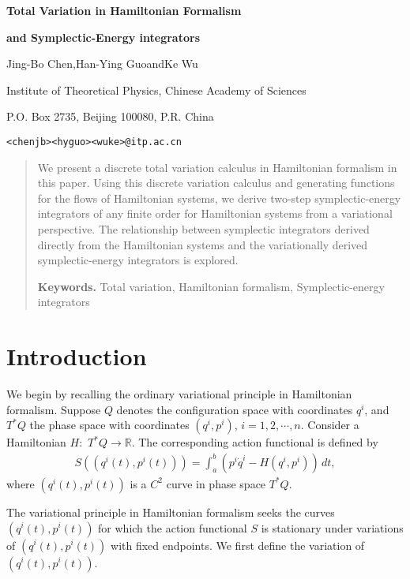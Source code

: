\documentclass[a4paper,a4paper]{article}
\def\sect#1{\section{#1}\setcounter{equation}{0}}
\begin{document}

\centerline{} \vskip0.5cm \centerline{\LARGE \bf Total Variation
in Hamiltonian Formalism} \vskip3pt \centerline{\LARGE \bf and
Symplectic-Energy integrators } \vskip0.7cm \centerline{\large
Jing-Bo Chen,\quad Han-Ying Guo\quad and\quad Ke Wu} \vskip3pt
\centerline{\small Institute of Theoretical Physics, Chinese
Academy of Sciences} \vskip3pt \centerline{\small P.O. Box  2735,
Beijing 100080, P.R. China} \vskip3pt \centerline{\small
\texttt{<chenjb><hyguo><wuke>@itp.ac.cn}} \vskip1cm


\begin{abstract}
We present a discrete total variation calculus in Hamiltonian
formalism in this paper. Using this discrete variation calculus
and generating functions for the flows of Hamiltonian systems, we
derive two-step symplectic-energy integrators of any finite order
for Hamiltonian systems from a variational perspective. The
relationship between symplectic integrators derived directly from
the Hamiltonian systems and the variationally derived
symplectic-energy integrators is explored.

\vskip8pt
{\bf Keywords.}
Total variation, Hamiltonian formalism, Symplectic-energy integrators
\end{abstract}



\sect{Introduction}

We begin by recalling the ordinary variational principle in Hamiltonian formalism.
Suppose $Q$ denotes the  configuration space with coordinates $q^{i}$, and
$T^{*}Q$ the phase space with coordinates $(q^{i}, p^{i})$, $i=1, 2,\cdots, n$.
Consider a Hamiltonian $H:\,\,T^{*}Q  \to \mathbb{R}$.
The corresponding action functional is defined by
\begin{align}
    S((q^{i}(t), p^{i}(t)))=\int_{a}^{b}(p^{i}\dot{q}^{i}-H(q^{i}, p^{i}))
                             \,dt, \label{1.1}
\end{align}
where $(q^{i}(t), p^{i}(t))$ is a $C^{2}$ curve in phase space $T^{*}Q$.

The variational principle in Hamiltonian formalism seeks the curves
$(q^{i}(t), p^{i}(t))$ for which the action functional
$S$ is stationary under variations of $(q^{i}(t), p^{i}(t))$ with fixed
endpoints.  We first define the variation of $(q^{i}(t), p^{i}(t))$.
\end{document}
